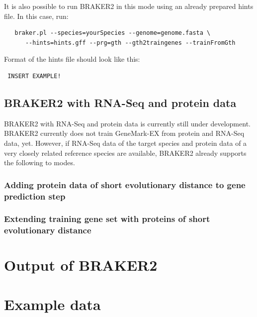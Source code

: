 \documentclass[a4paper,10pt]{report}
\begin{document}
It is also possible to run BRAKER2 in this mode using an already prepared hints file. In this case, run:

\begin{verbatim}
   braker.pl --species=yourSpecies --genome=genome.fasta \
      --hints=hints.gff --prg=gth --gth2traingenes --trainFromGth
\end{verbatim}

Format of the hints file should look like this:

\begin{verbatim}
 INSERT EXAMPLE!
\end{verbatim}


\section{BRAKER2 with RNA-Seq and protein data}

BRAKER2 with RNA-Seq and protein data is currently still under development. BRAKER2 currently does not train GeneMark-EX from protein and RNA-Seq data, yet. However, if RNA-Seq data of the target species and protein data of a very closely related reference species are available, BRAKER2 already supports the following to modes.

\subsection{Adding protein data of short evolutionary distance to gene prediction step}

\subsection{Extending training gene set with proteins of short evolutionary distance}

\chapter{Output of BRAKER2}

\chapter{Example data}
\end{document}
